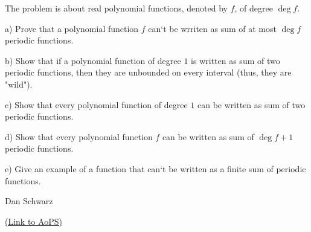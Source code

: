 \begin{problem}
	The problem is about real polynomial functions, denoted by $f$, of degree $\deg f$.

a) Prove that a polynomial function $f$ can`t be wrriten as sum of at most $\deg f$ periodic functions.

b) Show that if a polynomial function of degree $1$ is written as sum of two periodic functions, then they are unbounded on every interval (thus, they are "wild").

c) Show that every polynomial function of degree $1$ can be written as sum of two periodic functions.

d) Show that every polynomial function $f$ can be written as sum of $\deg f+1$ periodic functions.

e) Give an example of a function that can`t be written as a finite sum of periodic functions.

\begin{italicized}Dan Schwarz\end{italicized}
	\flushright \href{https://artofproblemsolving.com/community/c6h153374}{(Link to AoPS)}
\end{problem}



